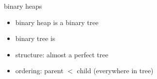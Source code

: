 \begin{frame}{binary heaps}
\begin{itemize}
\item binary heap is a binary tree
\item binary tree is 
\item structure: almost a perfect tree
\item ordering: parent $<$ child (everywhere in tree)
\end{itemize}
\end{frame} 
